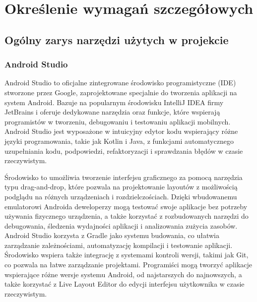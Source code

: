 \newpage
\section{Określenie wymagań szczegółowych}		%

\subsection{Ogólny zarys narzędzi użytych w projekcie}

\subsubsection{Android Studio}
Android Studio to oficjalne zintegrowane środowisko programistyczne (IDE) stworzone przez Google, zaprojektowane specjalnie do tworzenia aplikacji na system Android. Bazuje na popularnym środowisku IntelliJ IDEA firmy JetBrains i oferuje dedykowane narzędzia oraz funkcje, które wspierają programistów w tworzeniu, debugowaniu i testowaniu aplikacji mobilnych. Android Studio jest wyposażone w intuicyjny edytor kodu wspierający różne języki programowania, takie jak Kotlin i Java, z funkcjami automatycznego uzupełniania kodu, podpowiedzi, refaktoryzacji i sprawdzania błędów w czasie rzeczywistym.

Środowisko to umożliwia tworzenie interfejsu graficznego za pomocą narzędzia typu drag-and-drop, które pozwala na projektowanie layoutów z możliwością podglądu na różnych urządzeniach i rozdzielczościach. Dzięki wbudowanemu emulatorowi Androida deweloperzy mogą testować swoje aplikacje bez potrzeby używania fizycznego urządzenia, a także korzystać z rozbudowanych narzędzi do debugowania, śledzenia wydajności aplikacji i analizowania zużycia zasobów. Android Studio korzysta z Gradle jako systemu budowania, co ułatwia zarządzanie zależnościami, automatyzację kompilacji i testowanie aplikacji. Środowisko wspiera także integrację z systemami kontroli wersji, takimi jak Git, co pozwala na łatwe zarządzanie projektami. Programiści mogą tworzyć aplikacje wspierające różne wersje systemu Android, od najstarszych do najnowszych, a także korzystać z Live Layout Editor do edycji interfejsu użytkownika w czasie rzeczywistym.

